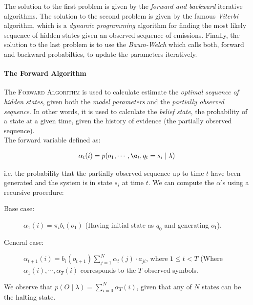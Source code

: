 The solution to the first problem is given by the \emph{forward and backward} iterative algorithms. The solution to the second problem is given by the famous \emph{Viterbi} algorithm, which is a \emph{dynamic programming} algorithm for finding the most likely sequence of hidden  states given an observed sequence of emissions. Finally, the solution to the last problem is to use the \emph{Baum-Welch} which calls both, forward and backward probabilties, to update the parameters iteratively. \\

\paragraph{The Forward Algorithm}
\label{tfa}

The \textsc{Forward Algorithm} \cite{dugad1996tutorial} is used to calculate estimate the \textit{optimal sequence of hidden states}, given both the \textit{model parameters} and the \textit{partially observed sequence}. In other words, it is used to calculate the \textit{belief state}, the probability of a state at a given time, given the history of evidence (the partially observed sequence).\\

The forward variable defined as:

\begin{gather*}
 \alpha_t(i) = p(o_1, \cdots, \o_t, q_t = s_i \mid \lambda)
\end{gather*}

i.e. the probability that the partially observed sequence up to time $t$ have been generated and the system is in state $s_i$ at time $t$. We can compute the $\alpha$'s using a recursive procedure:

\begin{description}
	\item[Base case:]{$\alpha_1(i) = \pi_i b_i (o_1)$ (Having initial state as $q_0$ and generating $o_1$).}
	\item[General case:]{$\alpha_{t+1}(i) =  b_i (o_{t+1}) \sum\limits_{j=1}^{N} \alpha_{t}(j) \cdot a_{ji}$, where $1 \leq t < T$ (Where $\alpha_{1}(i), \cdots, \alpha_{T}(i)$ corresponds to the $T$ observed symbols.}
\end{description}

We observe that $p(O \mid \lambda) = \sum\limits_{i=0}^{N} \alpha_{T}(i)$, given that any of $N$ states can be the halting state. \\



